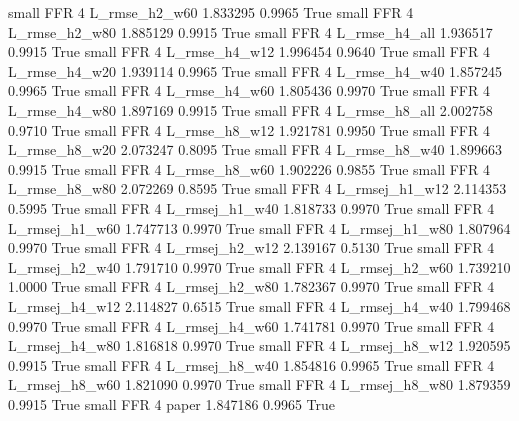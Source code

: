      small      FFR                 4  L_rmse_h2_w60   1.833295      0.9965    True
     small      FFR                 4  L_rmse_h2_w80   1.885129      0.9915    True
     small      FFR                 4  L_rmse_h4_all   1.936517      0.9915    True
     small      FFR                 4  L_rmse_h4_w12   1.996454      0.9640    True
     small      FFR                 4  L_rmse_h4_w20   1.939114      0.9965    True
     small      FFR                 4  L_rmse_h4_w40   1.857245      0.9965    True
     small      FFR                 4  L_rmse_h4_w60   1.805436      0.9970    True
     small      FFR                 4  L_rmse_h4_w80   1.897169      0.9915    True
     small      FFR                 4  L_rmse_h8_all   2.002758      0.9710    True
     small      FFR                 4  L_rmse_h8_w12   1.921781      0.9950    True
     small      FFR                 4  L_rmse_h8_w20   2.073247      0.8095    True
     small      FFR                 4  L_rmse_h8_w40   1.899663      0.9915    True
     small      FFR                 4  L_rmse_h8_w60   1.902226      0.9855    True
     small      FFR                 4  L_rmse_h8_w80   2.072269      0.8595    True
     small      FFR                 4 L_rmsej_h1_w12   2.114353      0.5995    True
     small      FFR                 4 L_rmsej_h1_w40   1.818733      0.9970    True
     small      FFR                 4 L_rmsej_h1_w60   1.747713      0.9970    True
     small      FFR                 4 L_rmsej_h1_w80   1.807964      0.9970    True
     small      FFR                 4 L_rmsej_h2_w12   2.139167      0.5130    True
     small      FFR                 4 L_rmsej_h2_w40   1.791710      0.9970    True
     small      FFR                 4 L_rmsej_h2_w60   1.739210      1.0000    True
     small      FFR                 4 L_rmsej_h2_w80   1.782367      0.9970    True
     small      FFR                 4 L_rmsej_h4_w12   2.114827      0.6515    True
     small      FFR                 4 L_rmsej_h4_w40   1.799468      0.9970    True
     small      FFR                 4 L_rmsej_h4_w60   1.741781      0.9970    True
     small      FFR                 4 L_rmsej_h4_w80   1.816818      0.9970    True
     small      FFR                 4 L_rmsej_h8_w12   1.920595      0.9915    True
     small      FFR                 4 L_rmsej_h8_w40   1.854816      0.9965    True
     small      FFR                 4 L_rmsej_h8_w60   1.821090      0.9970    True
     small      FFR                 4 L_rmsej_h8_w80   1.879359      0.9915    True
     small      FFR                 4          paper   1.847186      0.9965    True
